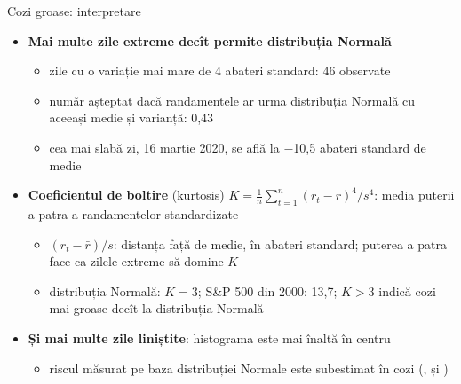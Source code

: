 \begin{frame}{Cozi groase: interpretare}
\itemsize{\small}
\begin{itemize}
    \item \textbf{Mai multe zile extreme decît permite distribuția Normală}
    \begin{itemize}
        \item zile cu o variație mai mare de 4 abateri standard: 46 observate
        \item număr așteptat dacă randamentele ar urma distribuția Normală cu aceeași medie și varianță: 0{,}43
        \item cea mai slabă zi, 16 martie 2020, se află la \ensuremath{-}10{,}5 abateri standard de medie
    \end{itemize}
    \item \textbf{Coeficientul de boltire} (kurtosis) $K = \frac{1}{n}\sum_{t=1}^n (r_t - \bar r)^4 / s^4$: media puterii a patra a randamentelor standardizate
    \begin{itemize}
        \item $(r_t - \bar r)/s$: distanța față de medie, în abateri standard; puterea a patra face ca zilele extreme să domine $K$
        \item distribuția Normală: $K = 3$; S\&P 500 din 2000: 13{,}7; $K > 3$ indică cozi mai groase decît la distribuția Normală
    \end{itemize}
    \item \textbf{Și mai multe zile liniștite}: histograma este mai înaltă în centru
    \begin{itemize}
        \item riscul măsurat pe baza distribuției Normale este subestimat în cozi (,  și )
    \end{itemize}
\end{itemize}
\end{frame}


